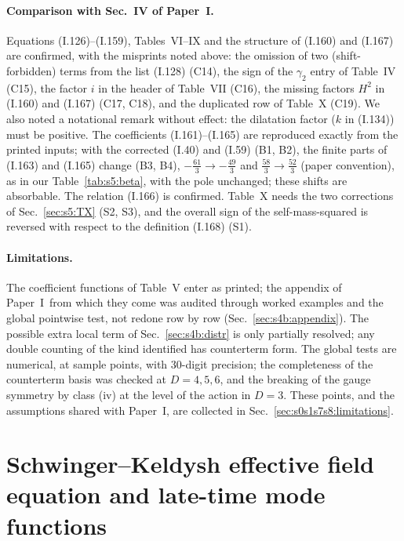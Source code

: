 \documentclass[aps,prd,onecolumn,10pt,nofootinbib,floatfix]{revtex4-2}
\newcommand{\PI}{Paper~I}
\newcommand{\eqI}[1]{(I.#1)}
\begin{document}
\paragraph*{Comparison with Sec.~IV of \PI.}
Equations \eqI{126}--\eqI{159}, Tables~VI--IX and the structure of \eqI{160} and \eqI{167} are confirmed, with the misprints noted above: the omission of two (shift-forbidden) terms from the list \eqI{128} (C14), the sign of the $\gamma_2$ entry of Table~IV (C15), the factor $i$ in the header of Table~VII (C16), the missing factors $H^2$ in \eqI{160} and \eqI{167} (C17, C18), and the duplicated row of Table~X (C19)\@. We also noted a notational remark without effect: the dilatation factor ($k$ in \eqI{134}) must be positive.
The coefficients \eqI{161}--\eqI{165} are reproduced exactly from the printed inputs; with the corrected \eqI{40} and \eqI{59} (B1, B2), the finite parts of \eqI{163} and \eqI{165} change (B3, B4), $-\frac{61}{3}\to-\frac{49}{3}$ and $\frac{58}{3}\to\frac{52}{3}$ (paper convention), as in our Table~\ref{tab:s5:beta}, with the pole unchanged; these shifts are absorbable. The relation \eqI{166} is confirmed.
Table~X needs the two corrections of Sec.~\ref{sec:s5:TX} (S2, S3), and the overall sign of the self-mass-squared is reversed with respect to the definition \eqI{168} (S1).

\paragraph*{Limitations.}
The coefficient functions of Table~V enter as printed; the appendix of \PI\ from which they come was audited through worked examples and the global pointwise test, not redone row by row (Sec.~\ref{sec:s4b:appendix}).
The possible extra local term of Sec.~\ref{sec:s4b:distr} is only partially resolved; any double counting of the kind identified has counterterm form.
The global tests are numerical, at sample points, with 30-digit precision; the completeness of the counterterm basis was checked at $D=4,5,6$, and the breaking of the gauge symmetry by class (iv) at the level of the action in $D=3$.
These points, and the assumptions shared with \PI, are collected in Sec.~\ref{sec:s0s1s7s8:limitations}.

\providecommand{\sixR}{\mathcal{R}}
\providecommand{\sixDk}{\mathcal{D}_k}
\providecommand{\sixO}{O}
\providecommand{\sixunit}{\frac{H^4u(0,k)}{16\pi^2}}

\section{Schwinger--Keldysh effective field equation and late-time mode functions}
\label{sec:s6}
\end{document}
